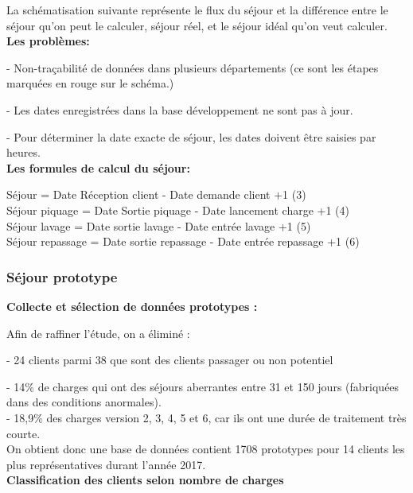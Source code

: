 \documentclass[12pt, a4paper]{thesis}
\begin{document}
La schématisation suivante représente le flux du séjour et la différence entre le séjour qu'on peut le calculer, séjour réel, et le séjour idéal qu'on veut calculer.\\
\textbf{Les problèmes:}
\item - Non-traçabilité de données dans plusieurs départements (ce sont les étapes marquées en rouge sur le schéma.)
\item - Les dates enregistrées dans la base développement ne sont pas à jour.
\item - Pour déterminer la date exacte de séjour, les dates doivent être saisies par heures.\\
\textbf{Les formules de calcul du séjour:}
\begin{center}
Séjour = Date Réception client - Date demande client +1       (3)\\  
Séjour piquage = Date Sortie piquage - Date lancement charge +1       (4)\\
Séjour lavage = Date sortie lavage - Date entrée lavage +1        (5)\\
Séjour repassage = Date sortie repassage - Date entrée repassage +1       (6)\end{center}
\begin{center}
 
 \end{center}
 
 
 
 
\subsubsection{Séjour prototype}

\textbf{Collecte et sélection de données prototypes :}\

Afin de raffiner l'étude, on a éliminé : \

- 24 clients parmi 38 que sont des clients passager ou non potentiel\

- 14\% de charges qui ont des séjours aberrantes entre 31 et 150 jours (fabriquées dans des conditions anormales). \\

- 18,9\% des charges version 2, 3, 4, 5 et 6, car ils ont une durée de traitement très courte.\\

On obtient donc une base de données contient 1708 prototypes pour 14 clients les plus représentatives durant l'année 2017.\\

 \textbf{Classification des clients selon nombre de charges}\
\end{document}
